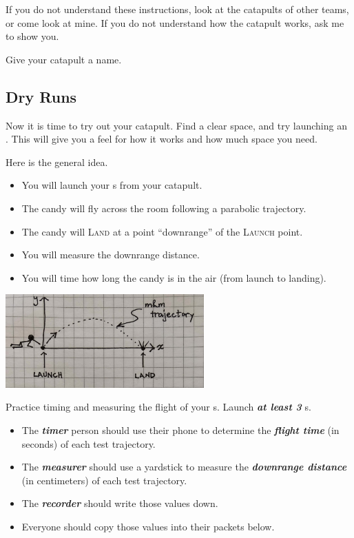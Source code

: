 If you do not understand these instructions, look at the catapults of other teams, or come look at mine.
If you do not understand how the catapult works, ask me to show you.

Give your catapult a {name}.

\subsection{Dry Runs}

Now it is time to try out your catapult. 
Find a clear space, and try launching an \mymm. 
This will give you a feel for how it works and how much space you need.

Here is the general idea.
\begin{itemize}[nosep]
    \item You will launch your \mymm{}s from your catapult.
    \item The candy will fly across the room following a parabolic trajectory.
    \item The candy will {\scshape Land} at a point ``downrange'' of the {\scshape Launch} point.
    \item You will measure the downrange distance.
    \item You will time how long the candy is in the air (from launch to landing).
\end{itemize}

\begin{center}
\includegraphics[width=3in]{../launch-and-landing.jpg}
\end{center}

Practice timing and measuring the flight of your \mymm{}s. 
Launch {\bfseries\itshape at least 3} \mymm{}s. 
\begin{itemize}[nosep]
    \item The {\bfseries\itshape timer} person should use their phone to determine 
        the {\bfseries\itshape flight time} (in seconds) of each test trajectory.
    \item The {\bfseries\itshape measurer} should use a yardstick to measure 
        the {\bfseries\itshape downrange distance} (in centimeters) of each test trajectory.
    \item The {\bfseries\itshape recorder} should write those values down.
    \item Everyone should copy those values into their packets below.
\end{itemize}


